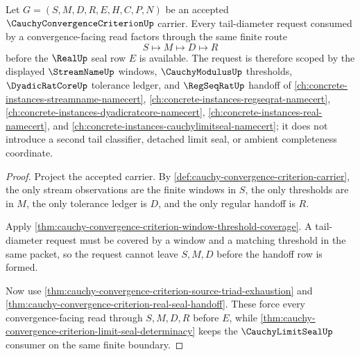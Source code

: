 \begin{theorem}
\label{thm:cauchy-convergence-criterion-tail-diameter-scope}
Let $G=(S,M,D,R,E,H,C,P,N)$ be an accepted $\CauchyConvergenceCriterionUp$ carrier. Every tail-diameter request consumed by a convergence-facing read factors through the same finite route
$$
S \longmapsto M \longmapsto D \longmapsto R
$$
before the $\RealUp$ seal row $E$ is available. The request is therefore scoped by the displayed $\StreamNameUp$ windows, $\CauchyModulusUp$ thresholds, $\DyadicRatCoreUp$ tolerance ledger, and $\RegSeqRatUp$ handoff of \autoref{ch:concrete-instances-streamname-namecert}, \autoref{ch:concrete-instances-regseqrat-namecert}, \autoref{ch:concrete-instances-dyadicratcore-namecert}, \autoref{ch:concrete-instances-real-namecert}, and \autoref{ch:concrete-instances-cauchylimitseal-namecert}; it does not introduce a second tail classifier, detached limit seal, or ambient completeness coordinate.
\end{theorem}
\begin{proof}
Project the accepted carrier. By \autoref{def:cauchy-convergence-criterion-carrier}, the only stream observations are the finite windows in $S$, the only thresholds are in $M$, the only tolerance ledger is $D$, and the only regular handoff is $R$.

Apply \autoref{thm:cauchy-convergence-criterion-window-threshold-coverage}. A tail-diameter request must be covered by a window and a matching threshold in the same packet, so the request cannot leave $S,M,D$ before the handoff row is formed.

Now use \autoref{thm:cauchy-convergence-criterion-source-triad-exhaustion} and \autoref{thm:cauchy-convergence-criterion-real-seal-handoff}. These force every convergence-facing read through $S,M,D,R$ before $E$, while \autoref{thm:cauchy-convergence-criterion-limit-seal-determinacy} keeps the $\CauchyLimitSealUp$ consumer on the same finite boundary.
\end{proof}

